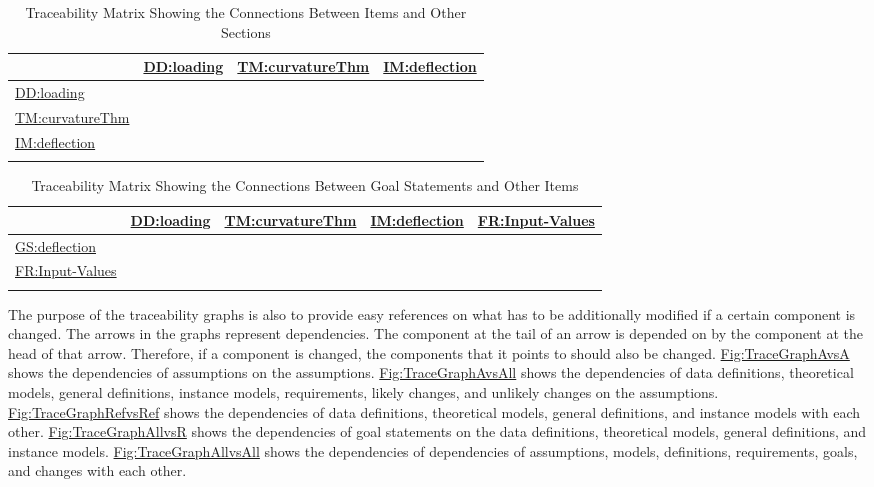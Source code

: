 \documentclass[12pt]{article}
\begin{document}
\begin{longtable}{l l l l}
\toprule
\textbf{} & \textbf{\hyperref[DD:loading]{DD:loading}} & \textbf{\hyperref[TM:curvatureThm]{TM:curvatureThm}} & \textbf{\hyperref[IM:deflection]{IM:deflection}}
\\
\midrule
\endhead
\hyperref[DD:loading]{DD:loading} &  &  & 
\\
\hyperref[TM:curvatureThm]{TM:curvatureThm} &  &  & 
\\
\hyperref[IM:deflection]{IM:deflection} &  &  & 
\\
\bottomrule
\caption{Traceability Matrix Showing the Connections Between Items and Other Sections}
\label{Table:TraceMatRefvsRef}
\end{longtable}
\begin{longtable}{l l l l l}
\toprule
\textbf{} & \textbf{\hyperref[DD:loading]{DD:loading}} & \textbf{\hyperref[TM:curvatureThm]{TM:curvatureThm}} & \textbf{\hyperref[IM:deflection]{IM:deflection}} & \textbf{\hyperref[inputValues]{FR:Input-Values}}
\\
\midrule
\endhead
\hyperref[deflection]{GS:deflection} &  &  &  & 
\\
\hyperref[inputValues]{FR:Input-Values} &  &  &  & 
\\
\bottomrule
\caption{Traceability Matrix Showing the Connections Between Goal Statements and Other Items}
\label{Table:TraceMatAllvsR}
\end{longtable}
The purpose of the traceability graphs is also to provide easy references on what has to be additionally modified if a certain component is changed. The arrows in the graphs represent dependencies. The component at the tail of an arrow is depended on by the component at the head of that arrow. Therefore, if a component is changed, the components that it points to should also be changed. \hyperref[Figure:TraceGraphAvsA]{Fig:TraceGraphAvsA} shows the dependencies of assumptions on the assumptions. \hyperref[Figure:TraceGraphAvsAll]{Fig:TraceGraphAvsAll} shows the dependencies of data definitions, theoretical models, general definitions, instance models, requirements, likely changes, and unlikely changes on the assumptions. \hyperref[Figure:TraceGraphRefvsRef]{Fig:TraceGraphRefvsRef} shows the dependencies of data definitions, theoretical models, general definitions, and instance models with each other. \hyperref[Figure:TraceGraphAllvsR]{Fig:TraceGraphAllvsR} shows the dependencies of goal statements on the data definitions, theoretical models, general definitions, and instance models. \hyperref[Figure:TraceGraphAllvsAll]{Fig:TraceGraphAllvsAll} shows the dependencies of dependencies of assumptions, models, definitions, requirements, goals, and changes with each other.
\end{document}
